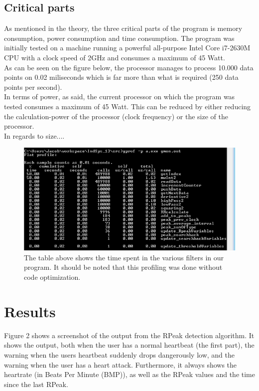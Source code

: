 \documentclass[12pt,a4paper]{article}
\begin{document}
\subsection{Critical parts}
	As mentioned in the theory, the three critical parts of the program is memory consumption, power consumption and time consumption. The program was initially tested on a machine running a powerful all-purpose Intel Core i7-2630M CPU with a clock speed of 2GHz and consumes a maximum of 45 Watt. \\
	As can be seen on the figure below, the processor manages to process 10.000 data points on 0.02 miliseconds which is far more than what is required (250 data points per second).\\
	In terms of power, as said, the current processor on which the program was tested consumes a maximum of 45 Watt. This can be reduced by either reducing the calculation-power of the processor (clock frequency) or the size of the processor.\\
	In regards to size....	
	\begin{figure}[h!]
		\centering
			\includegraphics[width=1\textwidth]{Screenshots/time_result.png}
		\caption{The table above shows the time spent in the various filters in our program. It should be noted that this profiling was done without code optimization.}
		\label{time_result}
	\end{figure}
	
\section{Results}
	Figure 2 shows a screenshot of the output from the RPeak detection algorithm. It shows the output, both when the user has a normal heartbeat (the first part), the warning when the users heartbeat suddenly drops dangerously low, and the warning when the user has a heart attack. Furthermore, it always shows the heartrate (in Beats Per Minute (BMP)), as well as the RPeak values and the time since the last RPeak.
	
\end{document}
